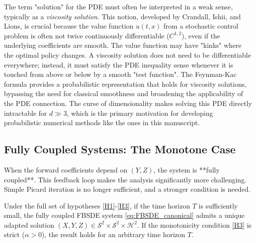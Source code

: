 \begin{remark}
The term "solution" for the PDE must often be interpreted in a weak sense, typically as a \emph{viscosity solution}. This notion, developed by Crandall, Ishii, and Lions, is crucial because the value function \(u(t,x)\) from a stochastic control problem is often not twice continuously differentiable (\(C^{1,2}\)), even if the underlying coefficients are smooth. The value function may have "kinks" where the optimal policy changes. A viscosity solution does not need to be differentiable everywhere; instead, it must satisfy the PDE inequality sense whenever it is touched from above or below by a smooth "test function". The Feynman-Kac formula provides a probabilistic representation that holds for viscosity solutions, bypassing the need for classical smoothness and broadening the applicability of the PDE connection. The curse of dimensionality makes solving this PDE directly intractable for $d \gg 3$, which is the primary motivation for developing probabilistic numerical methods like the ones in this manuscript.
\end{remark}

\subsection{Fully Coupled Systems: The Monotone Case}
\label{sec:fully_coupled}

When the forward coefficients depend on \((Y,Z)\), the system is **fully coupled**. This feedback loop makes the analysis significantly more challenging. Simple Picard iteration is no longer sufficient, and a stronger condition is needed.

\begin{theorem}
\label{thm:YongMa}
Under the full set of hypotheses \ref{H1}-\ref{H3}, if the time horizon \(T\) is sufficiently small, the fully coupled FBSDE system \eqref{eq:FBSDE_canonical} admits a unique adapted solution \((X,Y,Z) \in \mathcal{S}^2 \times \mathcal{S}^2 \times \mathcal{H}^2\). If the monotonicity condition \ref{H3} is strict (\(\alpha > 0\)), the result holds for an arbitrary time horizon \(T\).
\end{theorem}

